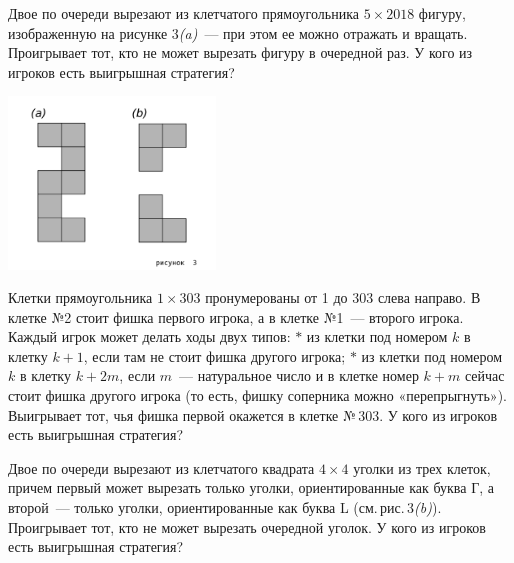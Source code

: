 ﻿
\begin{enumerate}
\itA Двое по очереди вырезают из клетчатого прямоугольника $5 \times 2018$ фигуру, изображенную на рисунке 3{\itshape(a)}~— при этом ее можно отражать и вращать. Проигрывает тот, кто не может вырезать фигуру в очередной раз. У кого из игроков есть выигрышная стратегия?

\centerline{\includegraphics[width=5.5cm]{stats/2018/images/geo-games}}

\itB Клетки прямоугольника $1 \times 303$ пронумерованы от 1 до 303 слева направо. В клетке №2 стоит фишка первого игрока, а в клетке №1~— второго игрока. Каждый игрок может делать ходы двух типов:
	\subitem $*$ из клетки под номером $k$ в клетку $k+1$, если там не стоит фишка другого игрока;
	\subitem $*$ из клетки под номером $k$ в клетку $k+2m$, если $m$~— натуральное число и в клетке номер $k+m$ сейчас стоит фишка другого игрока (то есть, фишку соперника можно «перепрыгнуть»). \medskip \\
Выигрывает тот, чья фишка первой окажется в клетке №\,303. У кого из игроков есть выигрышная стратегия?

\itC Двое по очереди вырезают из клетчатого квадрата $4 \times 4$ уголки из трех клеток, причем первый может вырезать только уголки, ориентированные как буква Г, а второй~— только уголки, ориентированные как буква L (см.\,рис.\,3{\itshape (b)}). Проигрывает тот, кто не может вырезать очередной уголок. У кого из игроков есть выигрышная стратегия?
\end{enumerate}